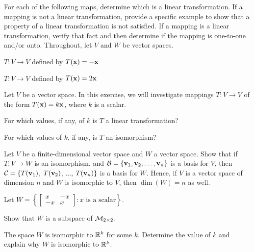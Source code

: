 \item For each of the following maps, determine which is a linear transformation. If a mapping is not a linear transformation, provide a specific example to show that a property of a linear transformation is not satisfied. If a mapping is a linear transformation, verify that fact and then determine if the mapping is one-to-one and/or onto. Throughout, let $V$ and $W$ be vector spaces.
     \ba

     \item $T: V \to V$ defined by $T(\mathbf{x}) = -\mathbf{x}$ 
     
     \item $T: V \to V$ defined by $T(\mathbf{x}) = 2\mathbf{x}$ 

    \ea

\item Let $V$ be a vector space. In this exercise, we will investigate mappings $T: V \to V$ of the form $T(\mathbf{x}) = k\mathbf{x}$, where $k$ is a scalar. 
	\ba
	\item For which values, if any, of $k$ is $T$ a linear transformation?


	\item For which values of $k$, if any, is $T$ an isomorphism?

	\ea

\item \label{ex:8_a_isomorphic_dimension} Let $V$ be a finite-dimensional vector space and $W$ a vector space. Show that if $T: V \to W$ is an isomorphism, and $\mathcal{B} = \{\mathbf{v}_1, \mathbf{v}_2, \ldots, \mathbf{v}_n\}$ is a basis for $V$, then $\mathcal{C} = \{T(\mathbf{v}_1)$, $T(\mathbf{v}_2)$, $\ldots$, $T(\mathbf{v}_n)\}$ is a basis for $W$. Hence, if $V$ is a vector space of dimension $n$ and $W$ is isomorphic to $V$, then $\dim(W) = n$ as well. 

	

\item Let $W = \left\{ \left[ \begin{array}{rr} x & -x \\ -x & x \end{array} \right] : x \text{ is a scalar}\right\}$.
    \ba
    \item Show that $W$ is a subspace of $\mathcal{M}_{2 \times 2}$. 

    \item The space $W$ is isomorphic to $\mathbb{R}^k$ for some $k$. Determine the value of $k$ and explain why $W$ is isomorphic to $\mathbb{R}^k$. 

    \ea


